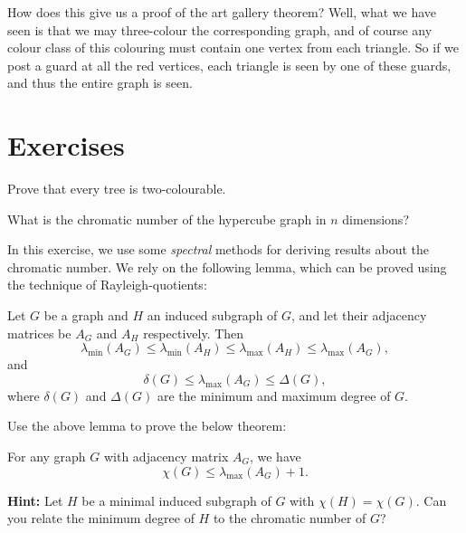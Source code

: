 \documentclass[nobib]{tufte-handout}
\begin{document}
How does this give us a proof of the art gallery theorem? Well, what we have seen is that we may three-colour the corresponding graph, and of course any colour class of this colouring must contain one vertex from each triangle. So if we post a guard at all the red vertices, each triangle is seen by one of these guards, and thus the entire graph is seen.

\section{Exercises}

\begin{xca}
  Prove that every tree is two-colourable.
\end{xca}

\begin{xca}
  What is the chromatic number of the hypercube graph in \(n\) dimensions?
\end{xca}

\begin{xca}
  In this exercise, we use some \emph{spectral} methods for deriving results about the chromatic number. We rely on the following lemma, which can be proved using the technique of Rayleigh-quotients:

  \begin{lemma}
    Let $G$ be a graph and $H$ an induced subgraph of $G$, and let their adjacency matrices be $A_G$ and $A_H$ respectively. Then
    $$\lambda_{\min}\left(A_G\right) \leq \lambda_{\min}\left(A_H\right) \leq \lambda_{\max}\left(A_H\right) \leq \lambda_{\max}\left(A_G\right),$$
    and
    $$\delta(G) \leq \lambda_{\max}\left(A_G\right) \leq \Delta(G),$$
    where $\delta(G)$ and $\Delta(G)$ are the minimum and maximum degree of $G$.
  \end{lemma}

  Use the above lemma to prove the below theorem:
  \begin{theorem}[Wilf, 1967]
    For any graph $G$ with adjacency matrix $A_G$, we have
    $$\chi(G) \leq \lambda_{\max}\left(A_G\right) + 1.$$
  \end{theorem}

  \textbf{Hint:} Let $H$ be a minimal induced subgraph of $G$ with $\chi(H) = \chi(G)$. Can you relate the minimum degree of $H$ to the chromatic number of $G$?
\end{xca}


%
%
\end{document}
